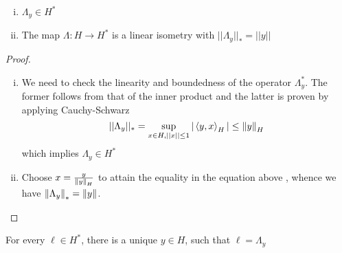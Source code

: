\documentclass{article}
\begin{document}
\begin{lemma}
    \hfill
    \begin{enumerate}[i)]
        \item  \(\Lambda_y \in H^*\)
        \item The map  \(\Lambda: H \to H^*\) is a linear isometry with  \(||\Lambda_y||_{*}=||y||\)
    \end{enumerate}
\end{lemma}  

\begin{proof}
    \begin{enumerate}[i)]
        \item We need to check the linearity and boundedness of the operator  \(\Lambda_y^*\). The former follows from that of the inner product and the latter is proven by applying Cauchy-Schwarz  
        \begin{equation*}
            ||\Lambda_y||_* = \sup_{x\in H, ||x|| \leq 1} |\left<{y},{x}\right>_H| \leq \left\|{y}\right\|_H
        \end{equation*}  
        which implies  \(\Lambda_y \in H^*\)
        
        \item Choose  \(x = \frac{y}{\left\|{y}\right\|_H}\) to attain the equality in the equation above , whence we have  \(\left\|{\Lambda_y}\right\|_*=\left\|{y}\right\|\).
    \end{enumerate}
\end{proof}

\begin{theorem}
     \nl
    \label{riesz representation}
    For every  \(\ell \in H^*\), there is a unique  \(y \in H\), such that  \(\ell=\Lambda_y\)
\end{theorem}  
\end{document}
